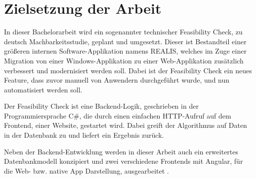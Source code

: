\section{Zielsetzung der Arbeit}
In dieser Bachelorarbeit wird ein sogenannter technischer Feasibility Check, zu deutsch Machbarkeitsstudie, geplant und umgesetzt. Dieser ist Bestandteil einer größeren internen Software-Applikation namens \gls{REALIS}, welches
im Zuge einer Migration  von einer Windows-Applikation zu einer Web-Applikation zusätzlich verbessert und modernisiert werden soll. Dabei ist der Feasibility Check ein neues Feature, dass zuvor manuell von Anwendern durchgeführt wurde, und nun automatisiert werden soll.

Der Feasibility Check ist eine Backend-Logik, geschrieben in der Programmiersprache C\#, die durch einen einfachen HTTP-Aufruf auf dem Frontend, einer Website, gestartet wird. Dabei greift der Algorithmus auf Daten in der Datenbank zu und liefert ein Ergebnis zurück.

Neben der Backend-Entwicklung werden in dieser Arbeit auch ein erweitertes Datenbankmodell konzipiert und zwei verschiedene Frontends mit Angular, für die Web- bzw. native App Darstellung, ausgearbeitet .